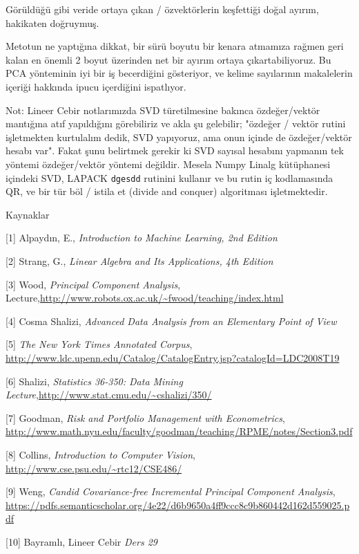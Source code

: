 \documentclass[12pt,fleqn]{article}\usepackage{../../common}
\begin{document}
Görüldüğü gibi veride ortaya çıkan / özvektörlerin keşfettiği doğal
ayırım, hakikaten doğruymuş.

Metotun ne yaptığına dikkat, bir sürü boyutu bir kenara atmamıza
rağmen geri kalan en önemli 2 boyut üzerinden net bir ayırım ortaya
çıkartabiliyoruz. Bu PCA yönteminin iyi bir iş becerdiğini gösteriyor,
ve kelime sayılarının makalelerin içeriği hakkında ipucu içerdiğini
ispatlıyor.

Not: Lineer Cebir notlarımızda SVD türetilmesine bakınca özdeğer/vektör
mantığına atıf yapıldığını görebiliriz ve akla şu gelebilir; "özdeğer / vektör
rutini işletmekten kurtulalım dedik, SVD yapıyoruz, ama onun içinde de
özdeğer/vektör hesabı var".  Fakat şunu belirtmek gerekir ki SVD sayısal
hesabını yapmanın tek yöntemi özdeğer/vektör yöntemi değildir. Mesela Numpy
Linalg kütüphanesi içindeki SVD, LAPACK \verb!dgesdd!  rutinini kullanır ve bu
rutin iç kodlamasında QR, ve bir tür böl / istila et (divide and conquer)
algoritması işletmektedir.

Kaynaklar

[1] Alpaydın, E., {\em Introduction to Machine Learning, 2nd Edition}

[2] Strang, G., {\em Linear Algebra and Its Applications, 4th Edition}

[3] Wood, {\em Principal Component Analysis}, Lecture,\url{http://www.robots.ox.ac.uk/~fwood/teaching/index.html}

[4] Cosma Shalizi, {\em Advanced Data Analysis from an Elementary Point of View}

[5] {\em The New York Times Annotated Corpus}, \url{http://www.ldc.upenn.edu/Catalog/CatalogEntry.jsp?catalogId=LDC2008T19}

[6] Shalizi, {\em Statistics 36-350: Data Mining Lecture},\url{http://www.stat.cmu.edu/~cshalizi/350/}

[7] Goodman, {\em Risk and Portfolio Management with Econometrics}, \url{http://www.math.nyu.edu/faculty/goodman/teaching/RPME/notes/Section3.pdf}

[8] Collins, {\em Introduction to Computer Vision}, \url{http://www.cse.psu.edu/~rtc12/CSE486/}

[9] Weng, {\em Candid Covariance-free Incremental Principal Component Analysis}, \url{https://pdfs.semanticscholar.org/4e22/d6b9650a4ff9ccc8c9b860442d162d559025.pdf}

[10] Bayramlı, Lineer Cebir {\em Ders 29}
\end{document}

